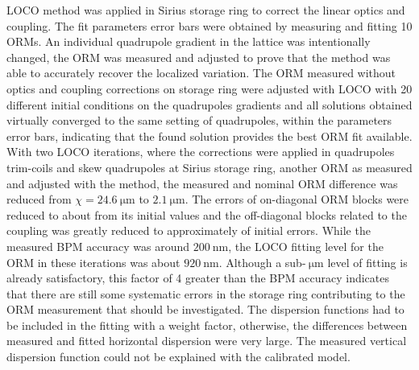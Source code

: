    LOCO method was applied in Sirius storage ring to correct the linear optics and coupling. The fit parameters error bars were obtained by measuring and fitting 10 ORMs. An individual quadrupole gradient in the lattice was intentionally changed, the ORM was measured and adjusted to prove that the method was able to accurately recover the localized variation. The ORM measured without optics and coupling corrections on storage ring were adjusted with LOCO with 20 different initial conditions on the quadrupoles gradients and all solutions obtained virtually converged to the same setting of quadrupoles, within the parameters error bars, indicating that the found solution provides the best ORM fit available. With two LOCO iterations, where the corrections were applied in quadrupoles trim-coils and skew quadrupoles at Sirius storage ring, another ORM as measured and adjusted with the method, the measured and nominal ORM difference was reduced from $\chi = \SI{24.6}{\micro\meter}$ to $\SI{2.1}{\micro\meter}$. The errors of on-diagonal ORM blocks were reduced to about  from its initial values and the off-diagonal blocks related to the coupling was greatly reduced to approximately  of initial errors. While the measured BPM accuracy was around $\SI{200}{\nano\meter}$, the LOCO fitting level for the ORM in these iterations was about $\SI{920}{\nano\meter}$. Although a sub-$\SI{}{\micro\meter}$ level of fitting is already satisfactory, this factor of 4 greater than the BPM accuracy indicates that there are still some systematic errors in the storage ring contributing to the ORM measurement that should be investigated. The dispersion functions had to be included in the fitting with a weight factor, otherwise, the differences between measured and fitted horizontal dispersion were very large. The measured vertical dispersion function could not be explained with the calibrated model. 
    

